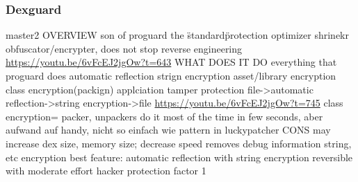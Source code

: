 \subsubsection{Dexguard}\label{subsection:software-dexguard}
master2\newline
OVERVIEW\newline
son of proguard\newline
the \"standard\" protection\newline
optimizer\newline
shrinekr\newline
obfuscator/encrypter, does not stop reverse engineering\newline
\url{https://youtu.be/6vFcEJ2jgOw?t=643}\newline
WHAT DOES IT DO\newline
everything that proguard does\newline
automatic reflection\newline
strign encryption\newline
asset/library encryption\newline
class encryption(packign)\newline
applciation tamper protection\newline
file->automatic reflection->string encryption->file\newline
\url{https://youtu.be/6vFcEJ2jgOw?t=745}\newline
class encryption= packer, unpackers do it most of the time in few seconds, aber aufwand auf handy, nicht so einfach wie pattern in luckypatcher\newline
CONS\newline
may increase dex size, memory size; decrease speed\newline
removes debug information\newline
string, etc encryption\newline
best feature: automatic reflection with string encryption\newline
reversible with moderate effort\newline
hacker protection factor 1\newline
